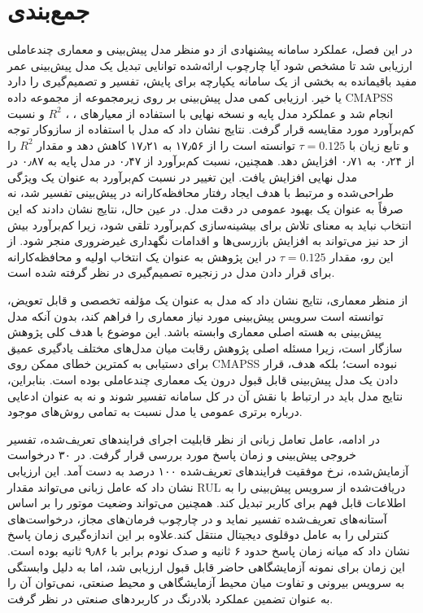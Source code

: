 \section{جمع‌بندی}
\label{sec:chapter5-summary}
در این فصل، عملکرد سامانه پیشنهادی از دو منظر مدل پیش‌بینی و معماری چندعاملی ارزیابی شد تا مشخص شود آیا چارچوب ارائه‌شده توانایی تبدیل یک مدل پیش‌بینی عمر مفید باقیمانده به بخشی از یک سامانه یکپارچه برای پایش، تفسیر و تصمیم‌گیری را دارد یا خیر. ارزیابی کمی مدل پیش‌بینی بر روی زیرمجموعه  از مجموعه داده \gls{CMAPSS} انجام شد و عملکرد مدل پایه و نسخه نهایی  با استفاده از معیارهای ، ، $R^2$ و نسبت کم‌برآورد مورد مقایسه قرار گرفت. نتایج نشان داد که مدل  با استفاده از سازوکار توجه و تابع زیان  با $\tau=0.125$ توانسته است  را از ۱۷٫۵۶ به ۱۷٫۲۱ کاهش دهد و مقدار $R^2$ را از ۰٫۲۴ به ۰٫۷۱ افزایش دهد. همچنین، نسبت کم‌برآورد از ۰٫۴۷ در مدل پایه به ۰٫۸۷ در مدل نهایی افزایش یافت. این تغییر در نسبت کم‌برآورد به عنوان یک ویژگی طراحی‌شده و مرتبط با هدف ایجاد رفتار محافظه‌کارانه در پیش‌بینی تفسیر شد، نه صرفاً به عنوان یک بهبود عمومی در دقت مدل. در عین حال، نتایج نشان دادند که این انتخاب نباید به معنای تلاش برای بیشینه‌سازی کم‌برآورد تلقی شود، زیرا کم‌برآورد بیش از حد نیز می‌تواند به افزایش بازرسی‌ها و اقدامات نگهداری غیرضروری منجر شود. از این رو، مقدار $\tau=0.125$ در این پژوهش به عنوان یک انتخاب اولیه و محافظه‌کارانه برای قرار دادن مدل در زنجیره تصمیم‌گیری در نظر گرفته شده است.

از منظر معماری، نتایج نشان داد که مدل  به عنوان یک مؤلفه تخصصی و قابل تعویض، توانسته است سرویس پیش‌بینی مورد نیاز معماری را فراهم کند، بدون آنکه مدل پیش‌بینی به هسته اصلی معماری وابسته باشد. این موضوع با هدف کلی پژوهش سازگار است، زیرا مسئله اصلی پژوهش رقابت میان مدل‌های مختلف یادگیری عمیق برای دستیابی به کمترین خطای ممکن روی \gls{CMAPSS} نبوده است؛ بلکه هدف، قرار دادن یک مدل پیش‌بینی قابل قبول درون یک معماری چندعاملی بوده است. بنابراین، نتایج مدل باید در ارتباط با نقش آن در کل سامانه تفسیر شوند و نه به عنوان ادعایی درباره برتری عمومی  یا مدل  نسبت به تمامی روش‌های موجود.

در ادامه، عامل تعامل زبانی از نظر قابلیت اجرای فرایندهای تعریف‌شده، تفسیر خروجی پیش‌بینی و زمان پاسخ مورد بررسی قرار گرفت. در ۳۰ درخواست آزمایش‌شده، نرخ موفقیت فرایندهای تعریف‌شده ۱۰۰ درصد به دست آمد. این ارزیابی نشان داد که عامل زبانی می‌تواند مقدار \gls{RUL} دریافت‌شده از سرویس پیش‌بینی را به اطلاعات قابل فهم برای کاربر تبدیل کند. همچنین می‌تواند وضعیت موتور را بر اساس آستانه‌های تعریف‌شده تفسیر نماید و در چارچوب فرمان‌های مجاز، درخواست‌های کنترلی را به عامل دوقلوی دیجیتال منتقل کند.علاوه‌ بر این اندازه‌گیری زمان پاسخ نشان داد که میانه زمان پاسخ حدود ۶ ثانیه و صدک نودم برابر با ۹٫۸۶ ثانیه بوده است. این زمان برای نمونه آزمایشگاهی حاضر قابل قبول ارزیابی شد، اما به دلیل وابستگی به سرویس بیرونی و تفاوت میان محیط آزمایشگاهی و محیط صنعتی، نمی‌توان آن را به عنوان تضمین عملکرد بلادرنگ در کاربردهای صنعتی در نظر گرفت.

